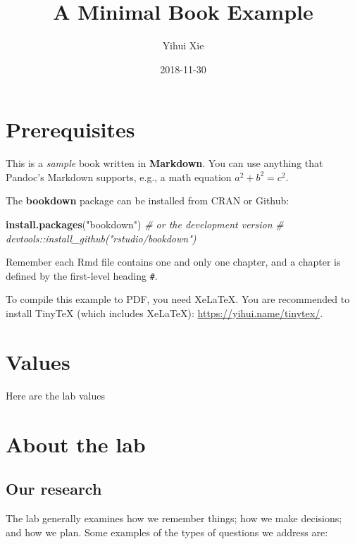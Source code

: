 \documentclass[]{book}
\title{A Minimal Book Example}
\author{Yihui Xie}
\date{2018-11-30}
\newenvironment{Shaded}{\begin{snugshade}}{\end{snugshade}}
\newcommand{\CommentTok}[1]{\textcolor[rgb]{0.56,0.35,0.01}{\textit{#1}}}
\newcommand{\KeywordTok}[1]{\textcolor[rgb]{0.13,0.29,0.53}{\textbf{#1}}}
\newcommand{\NormalTok}[1]{#1}
\newcommand{\StringTok}[1]{\textcolor[rgb]{0.31,0.60,0.02}{#1}}
\theoremstyle{definition}
\theoremstyle{definition}
\theoremstyle{definition}
\theoremstyle{remark}
\begin{document}
\maketitle

{
\setcounter{tocdepth}{1}
\tableofcontents
}
\hypertarget{prerequisites}{%
\chapter{Prerequisites}\label{prerequisites}}

This is a \emph{sample} book written in \textbf{Markdown}. You can use
anything that Pandoc's Markdown supports, e.g., a math equation
\(a^2 + b^2 = c^2\).

The \textbf{bookdown} package can be installed from CRAN or Github:

\begin{Shaded}
\begin{Highlighting}[]
\KeywordTok{install.packages}\NormalTok{(}\StringTok{"bookdown"}\NormalTok{)}
\CommentTok{# or the development version}
\CommentTok{# devtools::install_github("rstudio/bookdown")}
\end{Highlighting}
\end{Shaded}

Remember each Rmd file contains one and only one chapter, and a chapter
is defined by the first-level heading \texttt{\#}.

To compile this example to PDF, you need XeLaTeX. You are recommended to
install TinyTeX (which includes XeLaTeX):
\url{https://yihui.name/tinytex/}.

\hypertarget{values}{%
\chapter{Values}\label{values}}

Here are the lab values

\hypertarget{about-the-lab}{%
\chapter{About the lab}\label{about-the-lab}}

\hypertarget{our-research}{%
\section{Our research}\label{our-research}}

The lab generally examines how we remember things; how we make
decisions; and how we plan. Some examples of the types of questions we
address are:
\end{document}

